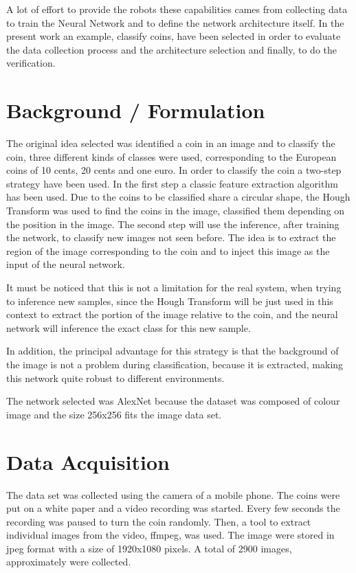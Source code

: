 \documentclass[10pt,journal,compsoc]{IEEEtran}
\begin{document}
A lot of effort to provide the robots these capabilities cames from collecting data to train the Neural Network and to define the network architecture itself. In the present work an example, classify coins, have been selected in order to evaluate the data collection process and the architecture selection and finally, to do the verification.
	
\section{Background / Formulation}

The original idea selected was identified a coin in an image and to classify the coin, three different kinds of classes were used, corresponding to the European coins of 10 cents, 20 cents and one euro. In order to classify the coin a two-step strategy have been used. In the first step a classic feature extraction algorithm has been used. Due to the coins to be classified share a circular shape, the Hough Transform was used to find the coins in the image, classified them depending on the position in the image. The second step will use the inference, after training the network, to classify new images not seen before. The idea is to extract the region of the image corresponding to the coin and to inject this image as the input of the neural network.

It must be noticed that this is not a limitation for the real system, when trying to inference new samples, since the Hough Transform will be just used in this context to extract the portion of the image relative to the coin, and the neural network will inference the exact class for this new sample. 

In addition, the principal advantage for this strategy is that the background of the image is not a problem during classification, because it is extracted, making this network quite robust to different environments.

The network selected was AlexNet because the dataset was composed of colour image and the size 256x256 fits the image data set. \cite{udacity} \cite{deeplearning}
		
\section{Data Acquisition}

The data set was collected using the camera of a mobile phone. The coins were put on a white paper and a video recording was started. Every few seconds the recording was paused to turn the coin randomly. Then, a tool to extract individual images from the video, ffmpeg, was used. The image were stored in jpeg format with a size of 1920x1080 pixels. A total of 2900 images, approximately were collected.
\end{document}
